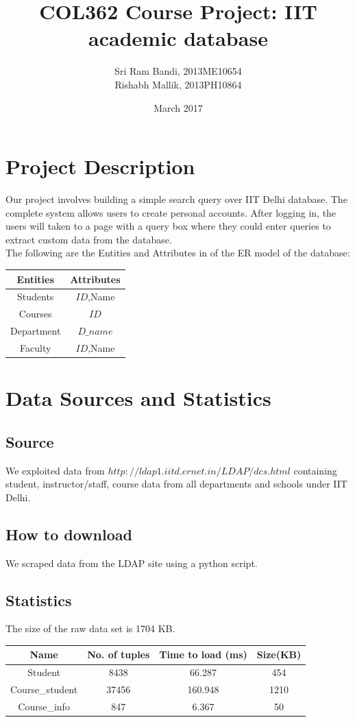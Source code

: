 \documentclass{article}
\title{COL362 Course Project: IIT academic database}
\author{Sri Ram Bandi, 2013ME10654
\protect\\ Rishabh Mallik, 2013PH10864 }
\date{March 2017}
\begin{document}
\maketitle

\section{Project Description}
Our project involves building a simple search query over IIT Delhi database. The complete system allows users to create personal accounts. After logging in, the users will taken to a page with a query box where they could enter queries to extract custom data from the database.\\The following are the Entities and Attributes in of the ER model of the database:\\
\begin{center}
\begin{tabular}{ |c|c| }
\hline
\textbf{Entities} & \textbf{Attributes}\\
\hline
 Students & $ID$,Name  \\
 \hline
 Courses & $ID$ \\
 \hline
 Department & $D\_name$\\
 \hline
 Faculty & $ID$,Name\\
 \hline
\end{tabular}
\end{center}


\section{Data Sources and Statistics}
\subsection{Source}We exploited data from $http://ldap1.iitd.ernet.in/LDAP/dcs.html$ containing student, instructor/staff, course data from all departments and schools under IIT Delhi. \\
\subsection{How to download}We scraped data from the LDAP site using a python script.
\subsection{Statistics}The size of the raw data set is 1704 KB.

\begin{center}
\begin{tabular}{ |c|c|c|c| }
\hline
\textbf{Name} & \textbf{No. of tuples} & \textbf{Time to load (ms)} & \textbf{Size(KB)} \\
\hline
 Student & 8438 & 66.287 & 454  \\
 \hline
 Course\_student & 37456 & 160.948 & 1210\\
 \hline
 Course\_info & 847 &6.367 & 50\\
 \hline
\end{tabular}
\end{center}
\end{document}
